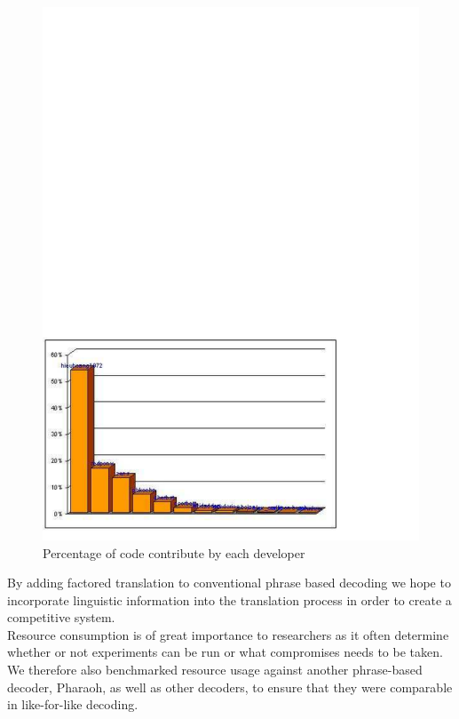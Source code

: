 \documentclass[11pt]{book}
\theoremstyle{plain}
\begin{document}
\begin{figure}[h]
\centering
\includegraphics[scale=0.2]{hieu-1}
\caption{Percentage of code contribute by each developer}
\end{figure}

By adding factored translation to conventional phrase based decoding we hope to incorporate linguistic information into the translation process in order to create a competitive system.\\

Resource consumption is of great importance to researchers as it often determine whether or not experiments can be run or what compromises needs to be taken. We therefore also benchmarked resource usage against another phrase-based decoder, Pharaoh, as well as other decoders, to ensure that they were comparable in like-for-like decoding.\\
\end{document}

